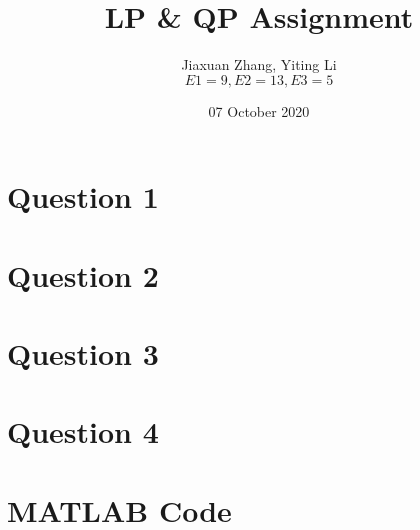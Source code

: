 \documentclass[titlepage,a4paper,12pt]{article}
\title{LP \& QP Assignment}
\author{Jiaxuan Zhang, Yiting Li \\
$E1=9,E2=13,E3=5$}
\date{07 October 2020}
\begin{document}
    \maketitle

    \tableofcontents

    \setlength{\parindent}{0pt}
    \setlength{\parskip}{0.3em}
    
    \newpage

    \section{Question 1}
    

    \section{Question 2}
    

    \section{Question 3}
    

    \section{Question 4}
    

    \newpage


    \section*{MATLAB Code}
    
\end{document}
